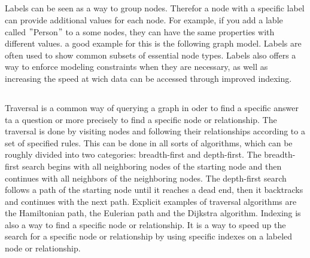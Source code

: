 \subsection{} \label{subsec:labels}
Labels can be seen as a way to group nodes.
Therefor a node with a specific label can provide additional values for each node.
For example, if you add a lable called \("\)Person\("\) to a some nodes, they can have the same properties with different values.
a good example for this is the following graph model.
Labels are often used to show common subsets of essential node types.
Labels also offers a way to enforce modeling constraints when they are necessary, as well as increasing the speed at wich data
can be accessed through improved indexing. \cite[compare P. 6f. ]{PractivalNeo4j}
\subsection{}\label{subsec:tbd{traversal-and-indexing}}
Traversal is a common way of querying a graph in oder to find a specific answer ta a question or more precisely to find a
specific node or relationship.
The traversal is done by visiting nodes and following their relationships according to a set of specified rules\cite[compare P.7 ]{PractivalNeo4j}.
This can be done in all sorts of algorithms, which can be roughly divided into two categories: breadth-first and depth-first.
The breadth-first  search begins with all neighboring nodes of the starting node and then continues with all neighbors of the neighboring nodes.
The depth-first search follows a path of the starting node until it reaches a dead end, then it backtracks and continues with the next path.
Explicit examples of traversal algorithms are the Hamiltonian path, the Eulerian path and the Dijkstra algorithm\cite[compare]{juypiter:Graph}.
Indexing is also a way to find a specific node or relationship.
It is a way to speed up the search for a specific node or relationship by using specific indexes on a labeled node or relationship\cite[compare P.7 ]{PractivalNeo4j}.